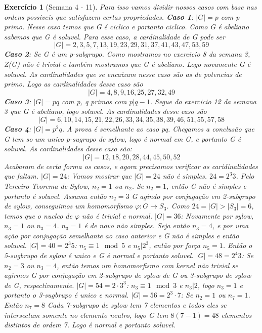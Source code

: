 \documentclass{article}
\newtheorem*{ex}{Exercício}
\begin{document}
\begin{ex}[Semana 4 - 11]
    Para isso vamos dividir nossos casos com base nas ordens possiveis que satisfazem certas propriedades.
    \textbf{Caso 1}: $|G| = p$ com p primo. Nesse caso temos que G é ciclico e portanto ciclico.
    Como G é abeliano sabemos que G é soluvel. Para esse caso, a cardinalidade de G pode ser
    \[|G| = 2, 3, 5, 7, 13, 19, 23, 29, 31, 37, 41, 43, 47, 53, 59\]
    \textbf{Caso 2}: Se G é um p-subgrupo. Como mostramos no exercicio 8 da semana 3, Z(G) não é trivial e também mostramos
    que G é abeliano. Logo novamente G é soluvel.
    As cardinalidades que se encaixam nesse caso são as de potencias de primo.
    Logo as cardinalidades desse caso são
    \[|G| = 4, 8, 9 ,16, 25, 27, 32, 49\]
    \textbf{Caso 3}: $|G| = pq$ com p, q primos com  $p \vert q-1 $. 
    Segue do exercicio 12 da semana 3 que G é abeliano, logo soluvel.
    As cardinalidades desse caso são
    \[|G| = 6, 10, 14, 15, 21, 22, 26, 33, 34, 35, 38, 39, 46, 51, 55, 57, 58\]
    \textbf{Caso 4}: $|G| = p^2q$. A prova é semelhante ao caso pq. Chegamos a conclusão
    que G tem so um unico p-sugrupo de sylow, logo é normal em G, e portanto G é soluvel.
    As cardinalidades desse caso são:
    \[|G| = 12, 18, 20, 28, 44, 45, 50, 52\]
    Acabaram de certa forma os casos, e agora precisamos verificar as caridinalidades que faltam.
    \textbf{$|G| = 24$}: Vamos mostrar que $|G| = 24$ não é simples. $24 = 2^{3}3$. 
    Pelo Terceiro Teorema de Sylow, $n_2 = 1$ ou $n_2$. Se $n_2 =1$, então G não é simples e portanto é soluvel.
    Assuma então $n_2 = 3$ G agindo por conjugação em 2-subgrupo de sylow, conseguimos um homomorfismo $\varphi: G \to S_3$.
    Como $24 = |G|>|S_3| = 6 $, temos que o nucleo de $\varphi$ não é trivial e normal. 
    \textbf{$|G| = 36$}: Novamente por sylow, $n_3 = 1$ ou $n_3 = 4$. $n_3 = 1$ é de novo não simples. 
    Seja então $n_3 = 4$, e por uma ação por conjugação semelhante ao caso anterior e G não é simples e então soluvel.
    \textbf{$|G| = 40 = 2^3 5$}: $n_5 \equiv 1 \mod 5$ e $n_5 \vert 2^3$, então por força $n_5 = 1$. Então o 5-sugbrupo de sylow 
    é unico e G é normal e portanto soluvel.
    \textbf{$|G| = 48 = 2^4 3$}: Se $n_2 = 3$ ou $n_3=4$, então temos um homomorfismo com kernel não trivial se 
    agirmos G por conjugação em 2-subgrupo de sylow de G ou 3-subgrupo de sylow de G, respectivamente.
    \textbf{$|G| = 54 = 2 \cdot 3^3$}: $n_3 \equiv 1 \mod 3$ e $n_3 \vert 2$, logo $n_3 =1 $ e portanto o 3-sugbrupo é unico e normal.
    \textbf{$|G| = 56 = 2^3 \cdot 7$}: Se $n_2 = 1 $ ou $n_7 = 1 $. Então $n_7 = 8$ Cada 7-subgrupo de sylow tem 7 elementos e todos eles se 
    intersectam somente no elemento neutro, logo G tem $8(7-1)=48$ elementos distintos de ordem 7. Logo é normal e portanto soluvel.
\end{ex}
\end{document}

